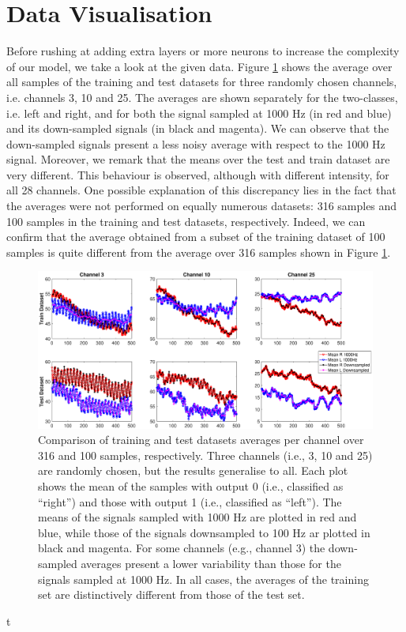 \documentclass{article}
\begin{document}
 \section{Data Visualisation}\label{sec_visual}
 Before rushing at adding extra layers or more neurons to increase the complexity of our model, we  take a look at the given data. 
 Figure \ref{fig_mean_1000hz_vs_downsampled} shows the average over all samples of the training and test datasets for three randomly chosen channels, i.e. channels 3, 10 and 25. 
The averages are shown separately for the two-classes, i.e. left and right, and for both the signal sampled at 1000 Hz (in red and blue) and its down-sampled signals (in black and magenta). 
We can observe that the down-sampled signals present a less noisy average with respect to the 1000 Hz signal. 
Moreover, we remark that  the means over the test and train dataset are very different. 
This behaviour is observed, although with different intensity, for all 28 channels. 
One possible explanation of this discrepancy lies in the fact that the averages were not performed on equally numerous datasets: 316 samples and 100 samples in the training and test datasets, respectively. 
Indeed, we can confirm that the average obtained from a subset of the training dataset of 100 samples is quite different from the average over 316 samples shown in Figure \ref{fig_mean_1000hz_vs_downsampled}. 
%
 \begin{figure}[h]
 \begin{center}
  \includegraphics[width=1\textwidth]{fig/fig4new_mean_downsampled_vs1000} 
  \caption{Comparison of training and test datasets averages per channel over 316 and 100 samples, respectively.  
  Three channels (i.e., 3, 10 and 25) are randomly chosen, but the results generalise to all. 
  Each plot shows the mean of the samples with output 0 (i.e., classified as ``right'') and those with output 1 (i.e., classified as ``left''). 
  The means of the signals sampled with 1000 Hz are plotted in red and blue, while those of the signals downsampled to 100 Hz ar plotted in black and magenta. 
For some channels (e.g., channel 3) the down-sampled averages present a lower variability than those for the signals sampled at 1000 Hz. 
  In all cases, the averages of the training set are distinctively different from those of the test set. 
  \label{fig_mean_1000hz_vs_downsampled}}
  \end{center}
  \end{figure}t
\end{document}
